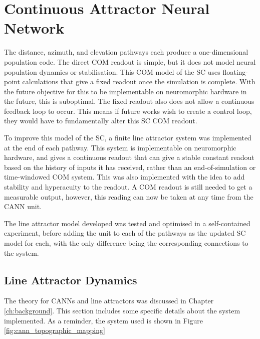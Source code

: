 \section{Continuous Attractor Neural Network}

The distance, azimuth, and elevation pathways each produce a one-dimensional population code. The direct COM readout is simple, but it does not model neural population dynamics or stabilisation. This COM model of the SC uses floating-point calculations that give a fixed readout once the simulation is complete. With the future objective for this to be implementable on neuromorphic hardware in the future, this is suboptimal. The fixed readout also does not allow a continuous feedback loop to occur. This means if future works wish to create a control loop, they would have to fundamentally alter this SC COM readout.

To improve this model of the SC, a finite line attractor system was implemented at the end of each pathway. This system is implementable on neuromorphic hardware, and gives a continuous readout that can give a stable constant readout based on the history of inputs it has received, rather than an end-of-simulation or time-windowed COM system. This was also implemented with the idea to add stability and hyperacuity to the readout. A COM readout is still needed to get a measurable output, however, this reading can now be taken at any time from the CANN unit.

The line attractor model developed was tested and optimised in a self-contained experiment, before adding the unit to each of the pathways as the updated SC model for each, with the only difference being the corresponding connections to the system.

\subsection{Line Attractor Dynamics}

The theory for CANNs and line attractors was discussed in Chapter \ref{ch:background}. This section includes some specific details about the system implemented. As a reminder, the system used is shown in Figure \ref{fig:cann_topographic_mapping}


